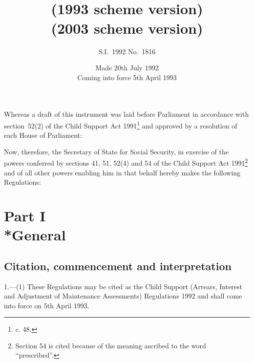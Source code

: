 \documentclass[12pt,a4paper]{article}
\title{\regstitle\\(1993 scheme version)}
\title{\regstitle\\(2003 scheme version)}
\author{S.I.~1992 No.~1816}
\date{Made 20th July 1992\\Coming into force 5th April 1993}
\begin{document}
\maketitle

\noindent
 Whereas a draft of this instrument was laid before Parliament in accordance with section~52(2) of the Child Support Act 1991\footnote{ c. 48.} and approved by a resolution of each House of Parliament:

Now, therefore, the Secretary of State for Social Security, in exercise of the powers conferred by sections 41, 51, 52(4) and 54 of the Child Support Act 1991\footnote{\frenchspacing Section 54 is cited because of the meaning ascribed to the word “prescribed”.} and of all other powers enabling him in that behalf hereby makes the following Regulations: 

{\sloppy

\tableofcontents

}

\setcounter{secnumdepth}{-2}

\section[Part I --- General]{Part I\\*General}

\renewcommand\parthead{--- Part I}

\subsection[1. Citation, commencement and interpretation]{Citation, commencement and interpretation}

1.—(1) These Regulations may be cited as the Child Support (Arrears, Interest and Adjustment of Maintenance Assessments) Regulations 1992 and shall come into force on 5th April 1993.
\end{document}
